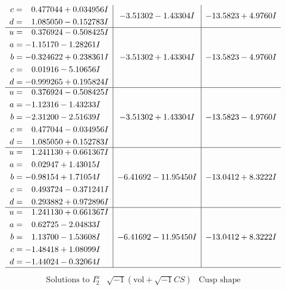 \documentclass[1p]{elsarticle_modified}
\theoremstyle{definition}
\newcommand{\I}{\sqrt{-1}}
\begin{document}
$$\begin{array}{c|c|c}
\begin{aligned}
c &= \phantom{-}0.477044 + 0.034956 I \\
d &= \phantom{-}1.085050 - 0.152783 I\end{aligned}
 & -3.51302 - 1.43304 I & -13.5823 + 4.9760 I \\ \hline\begin{aligned}
u &= \phantom{-}0.376924 - 0.508425 I \\
a &= -1.15170 - 1.28261 I \\
b &= -0.324622 + 0.238361 I \\
c &= \phantom{-}0.01916 - 5.10656 I \\
d &= -0.999265 + 0.195824 I\end{aligned}
 & -3.51302 + 1.43304 I & -13.5823 - 4.9760 I \\ \hline\begin{aligned}
u &= \phantom{-}0.376924 - 0.508425 I \\
a &= -1.12316 - 1.43233 I \\
b &= -2.31200 - 2.51639 I \\
c &= \phantom{-}0.477044 - 0.034956 I \\
d &= \phantom{-}1.085050 + 0.152783 I\end{aligned}
 & -3.51302 + 1.43304 I & -13.5823 - 4.9760 I \\ \hline\begin{aligned}
u &= \phantom{-}1.241130 + 0.661367 I \\
a &= \phantom{-}0.02947 + 1.43015 I \\
b &= -0.98154 + 1.71054 I \\
c &= \phantom{-}0.493724 - 0.371241 I \\
d &= \phantom{-}0.293882 + 0.972896 I\end{aligned}
 & -6.41692 - 11.95450 I & -13.0412 + 8.3222 I \\ \hline\begin{aligned}
u &= \phantom{-}1.241130 + 0.661367 I \\
a &= \phantom{-}0.62725 - 2.04833 I \\
b &= \phantom{-}1.13700 - 1.53608 I \\
c &= -1.48418 + 1.08099 I \\
d &= -1.44024 - 0.32064 I\end{aligned}
 & -6.41692 - 11.95450 I & -13.0412 + 8.3222 I\\
 \hline 
 \end{array}$$\newpage$$\begin{array}{c|c|c}  
\text{Solutions to }I^u_{2}& \I (\text{vol} + \sqrt{-1}CS) & \text{Cusp shape}\\

\end{array}$$
\end{document}
